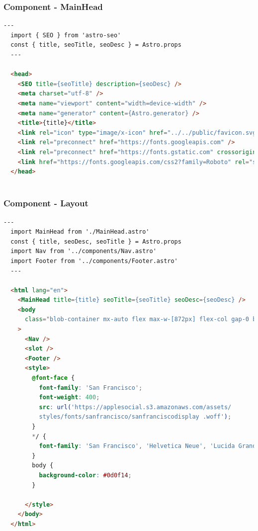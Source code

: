 \documentclass[12pt, a4paper, oneside]{article}
\begin{document}
\subsubsection{Component - MainHead}

\begin{lstlisting}[language=HTML, caption={Component - MainHead}, label=Component - MainHead]
  ---
  import { SEO } from 'astro-seo'
  const { title, seoTitle, seoDesc } = Astro.props
  ---
  
  <head>
    <SEO title={seoTitle} description={seoDesc} />
    <meta charset="utf-8" />
    <meta name="viewport" content="width=device-width" />
    <meta name="generator" content={Astro.generator} />
    <title>{title}</title>
    <link rel="icon" type="image/x-icon" href="../../public/favicon.svg" sizes="any" />
    <link rel="preconnect" href="https://fonts.googleapis.com" />
    <link rel="preconnect" href="https://fonts.gstatic.com" crossorigin />
    <link href="https://fonts.googleapis.com/css2?family=Roboto" rel="stylesheet" />
  </head>
  
\end{lstlisting}

\newpage

\subsubsection{Component - Layout}

\begin{lstlisting}[language=HTML, caption={Component - Layout}, label=Component - Layout]
  ---
  import MainHead from './MainHead.astro'
  const { title, seoDesc, seoTitle } = Astro.props
  import Nav from '../components/Nav.astro'
  import Footer from '../components/Footer.astro'
  ---
  
  <html lang="en">
    <MainHead title={title} seoTitle={seoTitle} seoDesc={seoDesc} />
    <body
      class="blob-container mx-auto flex max-w-[872px] flex-col gap-0 bg-neutral-900 px-10 py-8 text-sm text-white"
    >
      <Nav />
      <slot />
      <Footer />
      <style>
        @font-face {
          font-family: 'San Francisco';
          font-weight: 400;
          src: url('https://applesocial.s3.amazonaws.com/assets/
          styles/fonts/sanfrancisco/sanfranciscodisplay .woff');
        }
        */ {
          font-family: 'San Francisco', 'Helvetica Neue', 'Lucida Grande', sans-serif;
        }
        body {
          background-color: #0d0f14;
        }
        
      </style>
    </body>
  </html>
  
\end{lstlisting}
\end{document}
